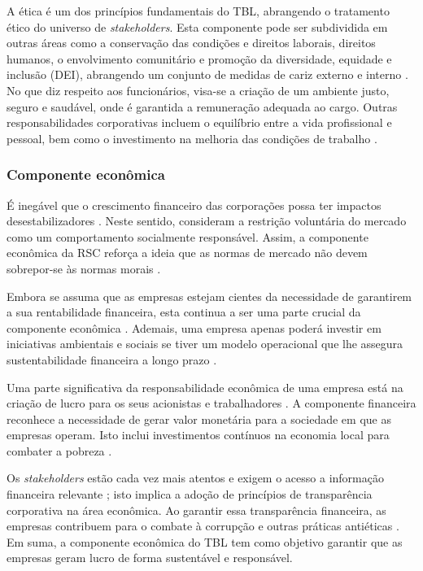 \documentclass[portuguese]{textolivre}
\begin{document}
A ética é um dos princípios fundamentais do TBL, abrangendo o tratamento ético do universo de \textit{stakeholders}. Esta componente pode ser subdividida em outras áreas como a conservação das condições e direitos laborais, direitos humanos, o envolvimento comunitário e promoção da diversidade, equidade e inclusão (DEI), abrangendo um conjunto de medidas de cariz externo e interno \cite{ksiezak_triple_2018}. No que diz respeito aos funcionários, visa-se a criação de um ambiente justo, seguro e saudável, onde é garantida a remuneração adequada ao cargo. Outras responsabilidades corporativas incluem o equilíbrio entre a vida profissional e pessoal, bem como o investimento na melhoria das condições de trabalho \cite{kotler_marketing_2022}.


\subsubsection{Componente econômica}\label{sec-modelo}
É inegável que o crescimento financeiro das corporações possa ter impactos desestabilizadores \cite{polman_net_2022}. Neste sentido, \textcite{bachnik_corporate_2022} consideram a restrição voluntária do mercado como um comportamento socialmente responsável. Assim, a componente econômica da RSC reforça a ideia que as normas de mercado não devem sobrepor-se às normas morais \cite{bachnik_corporate_2022}.

Embora se assuma que as empresas estejam cientes da necessidade de garantirem a sua rentabilidade financeira, esta continua a ser uma parte crucial da componente econômica \cite{ksiezak_triple_2018}. Ademais, uma empresa apenas poderá investir em iniciativas ambientais e sociais se tiver um modelo operacional que lhe assegura sustentabilidade financeira a longo prazo \cite{conley_como_2010}.

Uma parte significativa da responsabilidade econômica de uma empresa está na criação de lucro para os seus acionistas e trabalhadores \cite{daily_bankruptcy_1994}. A componente financeira reconhece a necessidade de gerar valor monetária para a sociedade em que as empresas operam. Isto inclui investimentos contínuos na economia local para combater a pobreza \cite{cezarino_dynamic_2019}.

Os \textit{stakeholders} estão cada vez mais atentos e exigem o acesso a informação financeira relevante \cite{francis_new_2022}; isto implica a adoção de princípios de transparência corporativa na área econômica. Ao garantir essa transparência financeira, as empresas contribuem para o combate à corrupção e outras práticas antiéticas \cite{rodriguezfernandez_sustainable_2020,ksiezak_triple_2018}. Em suma, a componente econômica do TBL tem como objetivo garantir que as empresas geram lucro de forma sustentável e responsável. 
\end{document}
